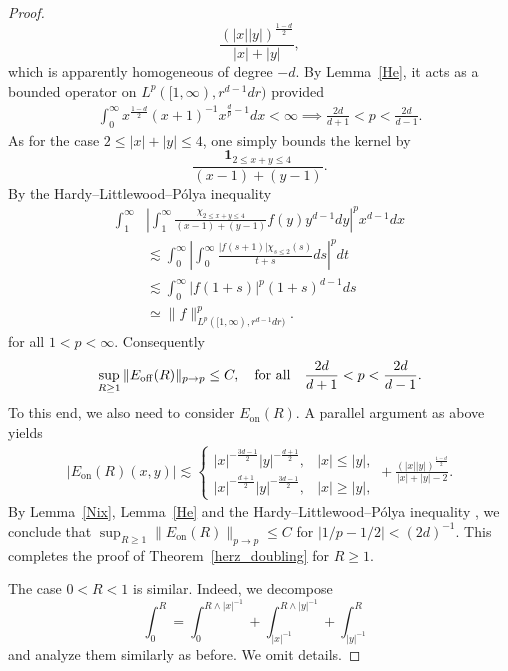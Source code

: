 \documentclass[12pt]{amsart}
\begin{document}
\begin{proof}
\begin{equation*}
 \frac{(|x||y|)^{\frac{1-d}{2}}}{|x|+|y|},
\end{equation*}
which is apparently homogeneous of degree $-d$. By Lemma~\ref{He}, it acts as a bounded operator on $L^p([1,\infty), r^{d-1}dr)$ provided
\begin{align*}
    \int_0^\infty x^{\frac{1-d}{2}} (x+1)^{-1} x^{\frac{d}{p}-1} dx <\infty \implies \frac{2d}{d+1}<p<\frac{2d}{d-1}.
\end{align*}
As for the case $2\le |x|+|y|\le 4$, one simply bounds the kernel by
\begin{equation*}
    \frac{\mathbf{1}_{2\le x+y\le 4}}{(x-1)+(y-1)}.
\end{equation*}
By the Hardy--Littlewood--Pólya inequality \cite[Theorem~319]{HLP}
\begin{align*}
    \int_1^{\infty} &\left| \int_1^\infty \frac{\chi_{2\le x+y\le 4}}{(x-1)+(y-1)} f(y) y^{d-1}dy \right|^p x^{d-1}dx\\
    &\lesssim \int_0^\infty \left| \int_0^\infty \frac{|f(s+1)|\chi_{s\le 2}(s)}{t+s} ds \right|^p dt\\
    &\lesssim \int_0^\infty |f(1+s)|^p (1+s)^{d-1} ds\\
    &\simeq \|f\|_{L^p([1,\infty), r^{d-1}dr)}^p.
\end{align*}
for all $1<p<\infty$. Consequently
\begin{equation*}
    \sup_{R\ge 1} \| E_{\mathrm{off}}(R)\|_{p\to p} \le C,\quad \mbox{\rm for all}\quad  \frac{2d}{d+1}<p<\frac{2d}{d-1}.
\end{equation*}
To this end, we also need to consider $E_{\mathrm{on}}(R)$. A parallel argument as above yields
\begin{align*}
|E_{\mathrm{on}}(R)(x,y)|\lesssim \begin{cases}
|x|^{-\frac{3d-1}{2}} |y|^{-\frac{d+1}{2}}, & |x|\le |y|,\\
|x|^{-\frac{d+1}{2}} |y|^{-\frac{3d-1}{2}}, & |x|\ge |y|,
\end{cases}+ \frac{(|x||y|)^{\frac{1-d}{2}}}{|x|+|y|-2}.
\end{align*}
By Lemma~\ref{Nix}, Lemma~\ref{He} and the Hardy--Littlewood--Pólya inequality \cite[Theorem~319]{HLP}, we conclude that $\sup_{R\ge 1}\| E_{\mathrm{on}}(R)\|_{p\to p}\le C $ for $|1/p-1/2|<(2d)^{-1}$. This completes the proof of Theorem~\ref{herz_doubling} for $R\ge 1$.

The case $0<R<1$ is similar. Indeed, we decompose
\begin{equation*}
    \int_0^R = \int_0^{R\wedge |x|^{-1}} + \int_{|x|^{-1}}^{R\wedge |y|^{-1}} + \int_{|y|^{-1}}^R
\end{equation*}
and analyze them similarly as before. We omit details.



\end{proof}
\end{document}

